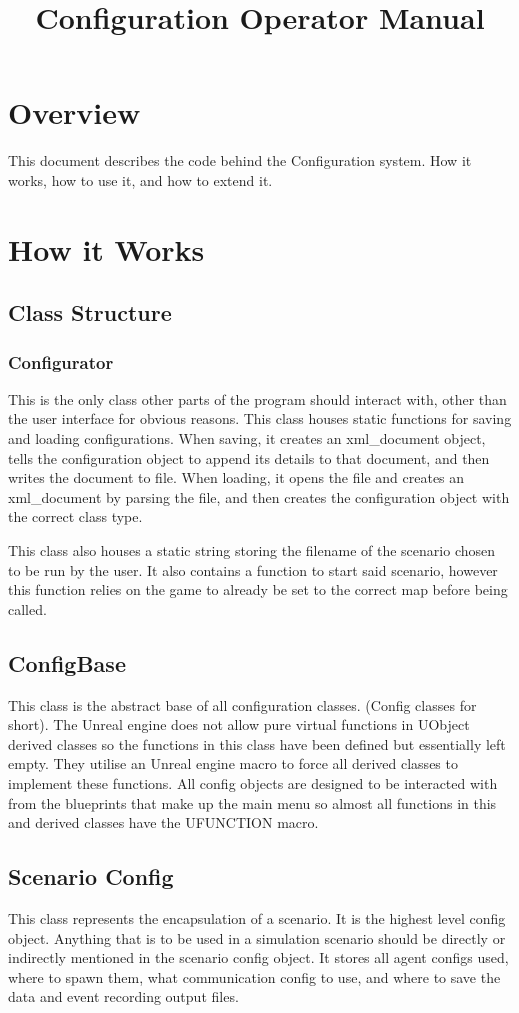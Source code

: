 \documentclass[../main.tex]{subfiles}
\title{Configuration Operator Manual}
\begin{document}
    
\section{Overview}
This document describes the code behind the Configuration system.
How it works, how to use it, and how to extend it.

\section{How it Works}

\subsection{Class Structure}
\subsubsection{Configurator}
This is the only class other parts of the program should interact with, other than the user interface for obvious reasons.
This class houses static functions for saving and loading configurations.
When saving, it creates an xml\_document object, tells the configuration object to append its details to that document, and then writes the document to file.
When loading, it opens the file and creates an xml\_document by parsing the file, and then creates the configuration object with the correct class type.

This class also houses a static string storing the filename of the scenario chosen to be run by the user.
It also contains a function to start said scenario, however this function relies on the game to already be set to the correct map before being called.

\subsection{ConfigBase}
This class is the abstract base of all configuration classes. (Config classes for short).
The Unreal engine does not allow pure virtual functions in UObject derived classes so the functions in this class have been defined but essentially left empty.
They utilise an Unreal engine macro to force all derived classes to implement these functions.
All config objects are designed to be interacted with from the blueprints that make up the main menu so almost all functions in this and derived classes have the UFUNCTION macro.

\subsection{Scenario Config}
This class represents the encapsulation of a scenario.
It is the highest level config object.
Anything that is to be used in a simulation scenario should be directly or indirectly mentioned in the scenario config object.
It stores all agent configs used, where to spawn them, what communication config to use, and where to save the data and event recording output files.
\end{document}

